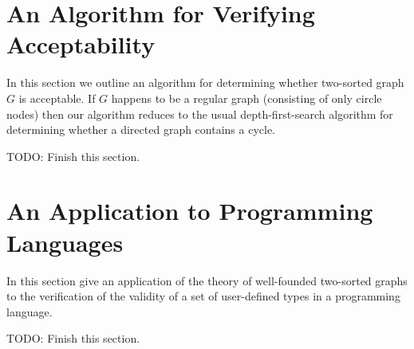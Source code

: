 \documentclass[oneside,12pt]{amsart}
\begin{document}

\section{An Algorithm for Verifying Acceptability}
In this section we outline an algorithm for determining whether two-sorted graph $G$ is acceptable.
If $G$ happens to be a regular graph (consisting of only circle nodes) then our algorithm reduces
to the usual depth-first-search algorithm for determining whether a directed graph contains a cycle.

TODO: Finish this section.

\section{An Application to Programming Languages}
In this section give an application of the theory of well-founded two-sorted graphs to the verification of the validity
of a set of user-defined types in a programming language.

TODO: Finish this section.
\end{document}
